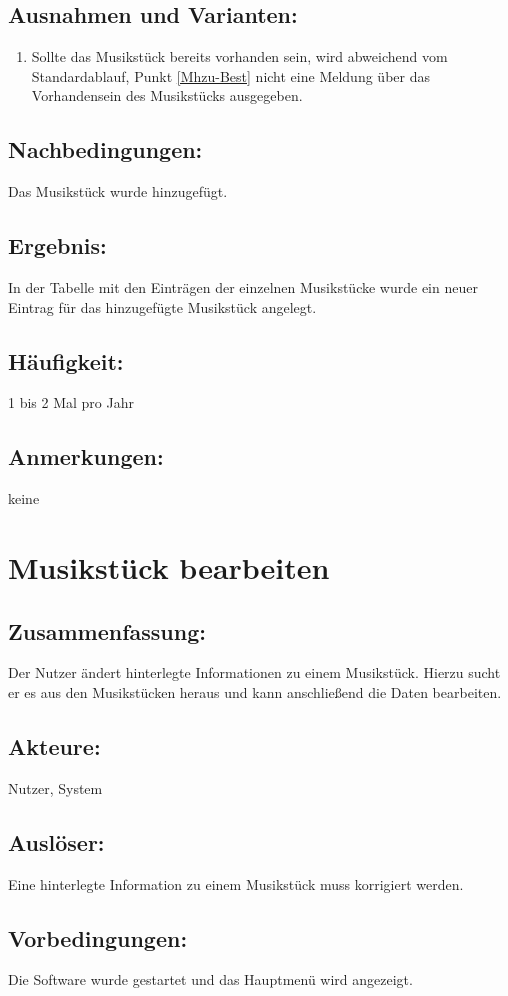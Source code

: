 \documentclass[a4paper,10pt]{scrartcl}
\begin{document}
\subsection{Ausnahmen und Varianten:}
	\begin{enumerate}
	\item Sollte das Musikstück bereits vorhanden sein, wird abweichend vom Standardablauf, Punkt \ref{Mhzu-Best} nicht eine Meldung über das Vorhandensein des Musikstücks ausgegeben.
\end{enumerate}
\subsection{Nachbedingungen:}
Das Musikstück wurde hinzugefügt.
\subsection{Ergebnis:}
In der Tabelle mit den Einträgen der einzelnen Musikstücke wurde ein neuer Eintrag für das hinzugefügte Musikstück angelegt.
\subsection{Häufigkeit:}
1 bis 2 Mal pro Jahr
\subsection{Anmerkungen:}
keine
\newpage

\section{Musikstück bearbeiten}
\label{uc musik bearbeiten}
\subsection{Zusammenfassung:}
Der Nutzer ändert hinterlegte Informationen zu einem Musikstück. Hierzu sucht er es aus den Musikstücken heraus und kann anschließend die Daten bearbeiten.
\subsection{Akteure:}
Nutzer, System
\subsection{Auslöser:}
Eine hinterlegte Information zu einem Musikstück muss korrigiert werden.
\subsection{Vorbedingungen:}
Die Software wurde gestartet und das Hauptmenü wird angezeigt.
\end{document}
